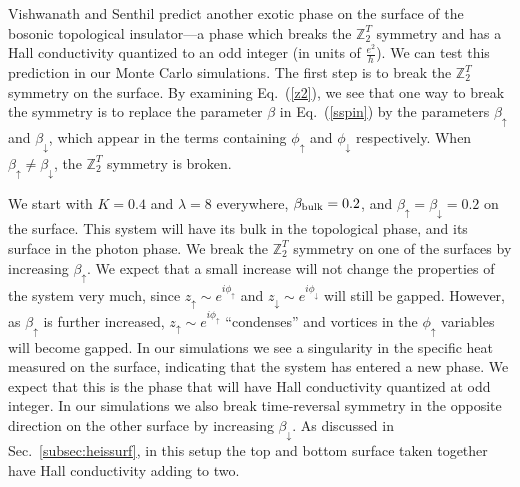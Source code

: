 \documentclass[prb,twocolumn]{revtex4-1}
\def\ztwot{\mathbb{Z}_2^T}
\begin{document}
Vishwanath and Senthil\cite{SenthilVishwanath} predict another exotic phase on the surface of the bosonic topological insulator---a phase which breaks the $\ztwot$ symmetry and has a Hall conductivity quantized to an odd integer (in units of $\frac{e^2}{h}$).  We can test this prediction in our Monte Carlo simulations. The first step is to break the $\ztwot$ symmetry on the surface. By examining Eq.~(\ref{z2}), we see that one way to break the symmetry is to replace the parameter $\beta$ in Eq.~(\ref{sspin}) by the parameters $\beta_\uparrow$ and $\beta_\downarrow$, which appear in the terms containing $\phi_\uparrow$ and $\phi_\downarrow$ respectively. When $\beta_\uparrow \neq \beta_\downarrow$, the $\ztwot$ symmetry is broken.

We start with $K=0.4$ and $\lambda=8$ everywhere, $\beta_{\rm bulk}=0.2$, and $\beta_{\uparrow}=\beta_{\downarrow}=0.2$ on the surface. This system will have its bulk in the topological phase, and its surface in the photon phase. We break the $\ztwot$ symmetry on one of the surfaces by increasing $\beta_{\uparrow}$. We expect that a small increase will not change the properties of the system very much, since $z_\uparrow\sim e^{i\phi_\uparrow}$ and $z_\downarrow\sim e^{i\phi_\downarrow}$ will still be gapped.\cite{LesikAshvin2} However, as $\beta_\uparrow$ is further increased, $z_\uparrow \sim e^{i\phi_\uparrow}$ ``condenses'' and vortices in the $\phi_\uparrow$ variables will become gapped. In our simulations we see a singularity in the specific heat measured on the surface, indicating that the system has entered a new phase. We expect that this is the phase that will have Hall conductivity quantized at odd integer. In our simulations we also break time-reversal symmetry in the opposite direction on the other surface by increasing $\beta_\downarrow$.  As discussed in Sec.~\ref{subsec:heissurf}, in this setup the top and bottom surface taken together have Hall conductivity adding to two.
\end{document}
